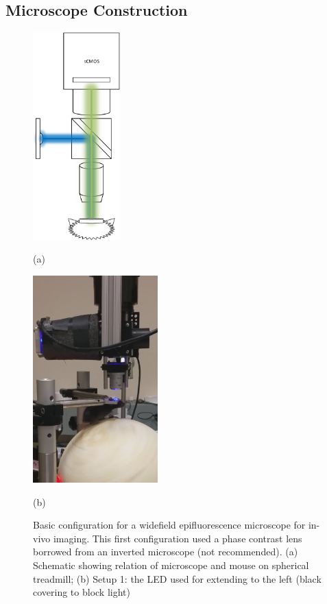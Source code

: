 \subsection{
	Microscope Construction}\label{microscope-construction} 

\begin{figure}[htb]
	\begin{minipage}[t]{0.49\linewidth}\centering \includegraphics[height=8cm]{2_body/figures/widefield_microscope_diagram.png} \medskip \centerline{(a)}
	\end{minipage}
	\hfill
	\begin{minipage}[t]{0.49\linewidth}\centering \includegraphics[height=8cm]{2_body/figures/setup1.jpg} \medskip \centerline{(b)}
	\end{minipage}
	\caption{Basic configuration for a widefield epifluorescence microscope for in-vivo imaging.
		This first configuration used a phase contrast lens borrowed from an inverted microscope (not recommended).
		(a) Schematic showing relation of microscope and mouse on spherical treadmill; (b) Setup 1: the LED used for extending to the left (black covering to block light)}
	\label{fig:Sampling}
\end{figure}

